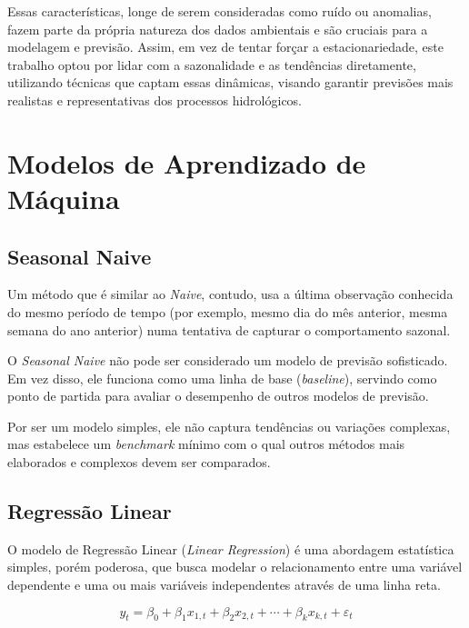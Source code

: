 Essas características, longe de serem consideradas como ruído ou anomalias, fazem parte da própria natureza dos dados ambientais e são cruciais para a modelagem e previsão. Assim, em vez de tentar forçar a estacionariedade, este trabalho optou por lidar com a sazonalidade e as tendências diretamente, utilizando técnicas que captam essas dinâmicas, visando garantir previsões mais realistas e representativas dos processos hidrológicos.

\section{Modelos de Aprendizado de Máquina}

\subsection{Seasonal Naive}

Um método que é similar ao \textit{Naive}, contudo, usa a última observação conhecida do mesmo período de tempo (por exemplo, mesmo dia do mês anterior, mesma semana do ano anterior) numa tentativa de capturar o comportamento sazonal.

O \textit{Seasonal Naive} não pode ser considerado um modelo de previsão sofisticado. Em vez disso, ele funciona como uma linha de base (\textit{baseline}), servindo como ponto de partida para avaliar o desempenho de outros modelos de previsão.\cite{hyndman_fpp3_2024d}

Por ser um modelo simples, ele não captura tendências ou variações complexas, mas estabelece um \textit{benchmark} mínimo com o qual outros métodos mais elaborados e complexos devem ser comparados.

\subsection{Regressão Linear}

O modelo de Regressão Linear (\textit{Linear Regression}) é uma abordagem estatística simples, porém poderosa, que busca modelar o relacionamento entre uma variável dependente e uma ou mais variáveis independentes através de uma linha reta.

\begin{equation}
y_{t} = \beta_{0} + \beta_{1} x_{1,t} + \beta_{2} x_{2,t} + \cdots +
\beta_{k} x_{k,t} + \varepsilon_{t}
\end{equation}

